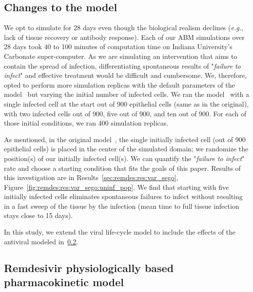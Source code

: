 \subsection{Changes to the \sags model}\label{sec:remdes:met:sego-changes}
We opt to simulate for 28 days even though the biological realism declines (\emph{e.g.}, lack of tissue recovery or antibody response). Each of our ABM simulations over 28 days took 40 to 100 minutes of computation time on Indiana University's Carbonate super-computer.
As we are simulating an intervention that aims to contain the spread of infection, differentiating spontaneous results of "\emph{failure to infect}" and effective treatment would be difficult and cumbersome. We, therefore, opted to perform more simulation replicas with the default parameters of the \sags model~\cite{sego_modular_2020} but varying the initial number of infected cells. We ran the \sags model~\cite{sego_modular_2020} with a single infected cell at the start out of 900 epithelial cells (same as in the original), with two infected cells out of 900, five out of 900, and ten out of 900. For each of those initial conditions, we ran 400 simulation replicas.

As mentioned, in the original model~\cite{sego_modular_2020}, the single initially infected cell (out of 900 epithelial cells) is placed in the center of the simulated domain; we randomize the position(s) of our initially infected cell(s). We can quantify the "\emph{failure to infect}" rate and choose a starting condition that fits the goals of this paper. Results of this investigation are in Results~\ref{sec:remdes:res:var_sego}, Figure~\ref{fig:remdes:res:var_sego:uninf_pop}. We find that starting with five initially infected cells eliminates spontaneous failures to infect without resulting in a fast sweep of the tissue by the infection (mean time to full tissue infection stays close to 15 days). 


In this study, we extend the viral life-cycle model to include the effects of the antiviral modeled in~\ref{sec:remdes:met:remdes_pk}.

\subsection{Remdesivir physiologically based pharmacokinetic model}\label{sec:remdes:met:remdes_pk}

